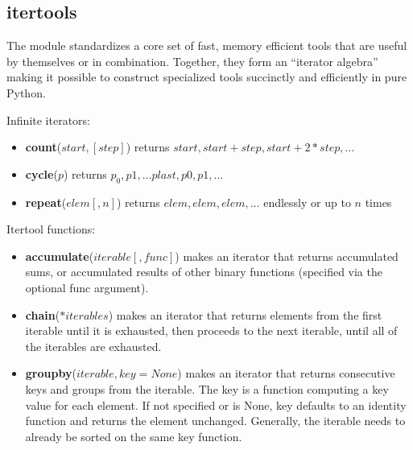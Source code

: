 \subsection{itertools}
The module standardizes a core set of fast, memory efficient tools that are useful by themselves or in combination. Together, they form an “iterator algebra” making it possible to construct specialized tools succinctly and efficiently in pure Python.

Infinite iterators:
\begin{itemize}
\item \textbf{count}($start,[step]$) returns $start, start+step, start+2*step, …$
\item \textbf{cycle}($p$) returns $p_0, p1, … plast, p0, p1, …$
\item \textbf{repeat}($elem [, n]$) returns $elem, elem, elem, …$ endlessly or up to $n$ times
\end{itemize}
Itertool functions:
\begin{itemize}
\item \textbf{accumulate}($iterable[, func]$) makes an iterator that returns accumulated sums, or accumulated results of other binary functions (specified via the optional func argument). 
\item \textbf{chain}($*iterables$) makes an iterator that returns elements from the first iterable until it is exhausted, then proceeds to the next iterable, until all of the iterables are exhausted.
\item \textbf{groupby}($iterable, key=None$) makes an iterator that returns consecutive keys and groups from the iterable. The key is a function computing a key value for each element. If not specified or is None, key defaults to an identity function and returns the element unchanged. Generally, the iterable needs to already be sorted on the same key function.

\end{itemize}